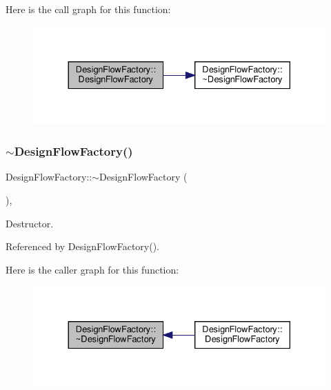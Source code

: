Here is the call graph for this function\+:
\nopagebreak
\begin{figure}[H]
\begin{center}
\leavevmode
\includegraphics[width=330pt]{d7/d9e/classDesignFlowFactory_a8b5cd27c16a15aa26cfb34076d30982d_cgraph}
\end{center}
\end{figure}
\mbox{\label{classDesignFlowFactory_a6d1f0b1bb0441952504d9c36454a341a}} 
\subsubsection{\texorpdfstring{$\sim$\+Design\+Flow\+Factory()}{~DesignFlowFactory()}}
{\footnotesize\ttfamily Design\+Flow\+Factory\+::$\sim$\+Design\+Flow\+Factory (\begin{DoxyParamCaption}{ }\end{DoxyParamCaption})\hspace{0.3cm}{\ttfamily [override]}, {\ttfamily [default]}}



Destructor. 



Referenced by Design\+Flow\+Factory().

Here is the caller graph for this function\+:
\nopagebreak
\begin{figure}[H]
\begin{center}
\leavevmode
\includegraphics[width=330pt]{d7/d9e/classDesignFlowFactory_a6d1f0b1bb0441952504d9c36454a341a_icgraph}
\end{center}
\end{figure}


